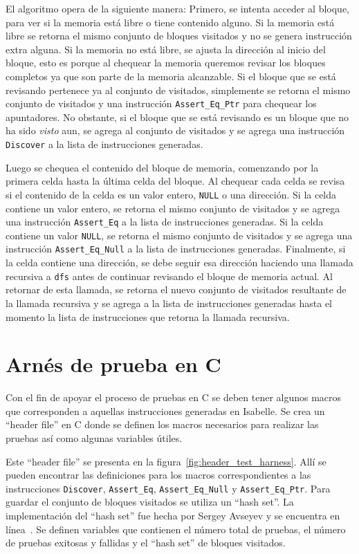El algoritmo opera de la siguiente manera:
Primero, se intenta acceder al bloque, para ver si la memoria está libre o tiene contenido alguno.
Si la memoria está libre se retorna el mismo conjunto de bloques visitados y no se genera instrucción extra alguna.
Si la memoria no está libre, se ajusta la dirección al inicio del bloque, esto es porque al chequear la memoria queremos revisar los bloques completos ya que son parte de la memoria alcanzable.
Si el bloque que se está revisando pertenece ya al conjunto de visitados, simplemente se retorna el mismo conjunto de visitados y una instrucción \verb|Assert_Eq_Ptr| para chequear los apuntadores.
No obstante, si el bloque que se está revisando es un bloque que no ha sido \textit{visto} aun, se agrega al conjunto de visitados y se agrega una instrucción \verb|Discover| a la lista de instrucciones generadas.

Luego se chequea el contenido del bloque de memoria, comenzando por la primera celda hasta la última celda del bloque.
Al chequear cada celda se revisa si el contenido de la celda es un valor entero, \verb|NULL| o una dirección.
Si la celda contiene un valor entero, se retorna el mismo conjunto de visitados y se agrega una instrucción \verb|Assert_Eq| a la lista de instrucciones generadas.
Si la celda contiene un valor \verb|NULL|, se retorna el mismo conjunto de visitados y se agrega una instrucción \verb|Assert_Eq_Null| a la lista de instrucciones generadas.
Finalmente, si la celda contiene una dirección, se debe seguir esa dirección haciendo una llamada recursiva a \verb|dfs| antes de continuar revisando el bloque de memoria actual.
Al retornar de esta llamada, se retorna el nuevo conjunto de visitados resultante de la llamada recursiva y se agrega a la lista de instrucciones generadas hasta el momento la lista de instrucciones que retorna la llamada recursiva.


\section{Arnés de prueba en C}

Con el fin de apoyar el proceso de pruebas en C se deben tener algunos macros que corresponden a aquellas instrucciones generadas en Isabelle.
Se crea un ``header file'' en C donde se definen los macros necesarios para realizar las pruebas así como algunas variables útiles.

Este ``header file'' se presenta en la figura~\ref{fig:header_test_harness}.
Allí se pueden encontrar las definiciones para los macros correspondientes a las instrucciones \verb|Discover|, \verb|Assert_Eq|, \verb|Assert_Eq_Null| y \verb|Assert_Eq_Ptr|.
Para guardar el conjunto de bloques visitados se utiliza un ``hash set''.
La implementación del ``hash set'' fue hecha por Sergey Avseyev y se encuentra en línea~\cite{hashset}.
Se definen variables que contienen el número total de pruebas, el número de pruebas exitosas y fallidas y el ``hash set'' de bloques visitados.


